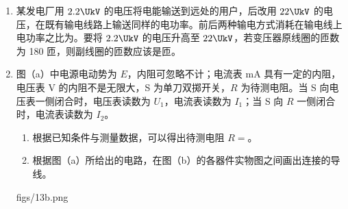 \documentclass[\gkver]{gaokaozhenti}
\begin{document}
\begin{enumerate}


\item
某发电厂用 $2.2\UkV$ 的电压将电能输送到远处的用户，后改用 $22\UkV$ 的电压，在既有输电线路上输送同样的电功率。前后两种输电方式消耗在输电线上电功率之比为。要将 $2.2\UkV$ 的电压升高至 $22\UkV$，若变压器原线圈的匝数为 180 匝，则副线圈的匝数应该是匝。



\item
图（a）中电源电动势为 $E$，内阻可忽略不计；电流表 mA 具有一定的内阻，电压表 V 的内阻不是无限大，S 为单刀双掷开关，$R$ 为待测电阻。当 S 向电压表一侧闭合时，电压表读数为 $U_{1}$，电流表读数为 $I_{1}$；当 S 向 $R$ 一侧闭合时，电流表读数为 $I_{2}$。

\begin{enumerate}
	\item
	根据已知条件与测量数据，可以得出待测电阻 $R=$。
	\item
	根据图（a）所给出的电路，在图（b）的各器件实物图之间画出连接的导线。
\end{enumerate}

{figs/13b.png}

\end{enumerate}
\end{document}
